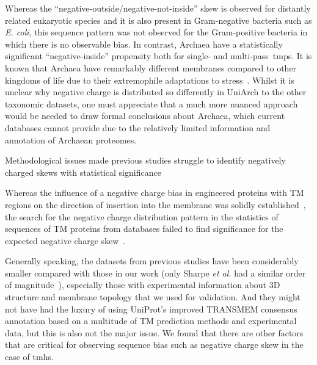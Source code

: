 Whereas the ``negative-outside/negative-not-inside'' skew is observed for distantly related eukaryotic species and it is also present in Gram-negative bacteria such as \textit{E.
coli}, this sequence pattern was not observed for the Gram-positive bacteria in which there is no observable bias.
In contrast, Archaea have a statistically significant ``negative-inside'' propensity both for single- and multi-pass~\gls{tmp}s.
It is known that Archaea have remarkably different membranes compared to other kingdoms of life due to their extremophile adaptations to stress~\cite{Oger2013}.
Whilst it is unclear why negative charge is distributed so differently in UniArch to the other taxonomic datasets, one must appreciate that a much more nuanced approach would be needed to draw formal conclusions about Archaea, which current databases cannot provide due to the relatively limited information and annotation of Archaean proteomes.

Methodological issues made previous studies struggle to identify negatively charged skews with statistical significance

Whereas the influence of a negative charge bias in engineered proteins with TM regions on the direction of insertion into the membrane was solidly established~\cite{Nilsson1990, Andersson1993, Kim1994, Andersson1992, Rutz1999}, the search for the negative charge distribution pattern in the statistics of sequences of TM proteins from databases failed to find significance for the expected negative charge skew~\cite{Sharpe2010, Baeza-Delgado2013, Granseth2005, Pogozheva2013, Nilsson2005a, Andersson1992}.

Generally speaking, the datasets from previous studies have been considerably smaller compared with those in our work (only Sharpe \textit{et al.} had a similar order of magnitude~\cite{Sharpe2010}), especially those with experimental information about 3D structure and membrane topology that we used for validation.
And they might not have had the luxury of using UniProt’s improved TRANSMEM consensus annotation based on a multitude of TM prediction methods and experimental data, but this is also not the major issue.
We found that there are other factors that are critical for observing sequence bias such as negative charge skew in the case of \gls{tmh}s.

